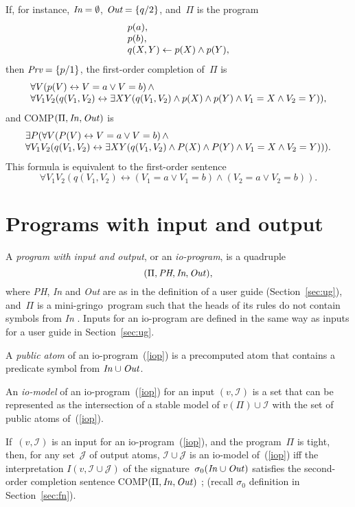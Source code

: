 \documentclass{tlp}
\def\ar{\leftarrow}
\def\lrar{\leftrightarrow}
\def\beq{\begin{equation}}
\def\eeq#1{\label{#1}\end{equation}}
\def\ba{\begin{array}}
\def\ea{\end{array}}
\def\gringo{{\sc gringo}}
\newcommand{\I}{\mathcal{I}}
\newcommand{\J}{\mathcal{J}}
\begin{document}
If, for instance, $\emph{In}=\emptyset$, $\emph{Out}=\{q/2\}$, and~$\Pi$
is the program
$$
\ba l
p(a),\\
p(b),\\
q(X,Y) \ar p(X) \land p(Y),
\ea$$
then $\emph{Prv}=\{p/1\}$,
the first-order completion of~$\Pi$ is
$$\ba l
\forall V(p(V) \lrar V=a \lor V=b)\,\land\\
\forall V_1V_2(q(V_1,V_2) \lrar \exists XY(q(V_1,V_2) \land p(X) \land p(Y)
\land V_1=X \land V_2=Y)),
\ea$$
and COMP$(\Pi,\emph{In\/},\emph{Out\/})$ is
$$
\ba l
\exists P(\forall V(P(V) \lrar V=a \lor V=b)\,\land\\
\forall V_1V_2(q(V_1,V_2) \lrar \exists XY(q(V_1,V_2) \land
P(X) \land P(Y) \land V_1=X \land V_2=Y))).
\ea
$$
This formula is equivalent to the first-order sentence
$$
\forall V_1V_2(q(V_1,V_2) \lrar (V_1=a \lor V_1=b)\land(V_2=a \lor V_2=b)).
$$

\section{Programs with input and output} \label{appc}

A \emph{program with input and output}, or an \emph{io-program},
is a quadruple
\beq
(\Pi,\emph{PH},\emph{In},\emph{Out\/}),
\eeq{iop}
where \emph{PH}, \emph{In} and \emph{Out} are as in the definition of
a user guide (Section~\ref{sec:ug}), and~$\Pi$ is a mini-\gringo\ program
such that the heads of its rules do not contain symbols from \emph{In}
\cite[Section~5.1]{fan20}.  Inputs for an io-program are defined in the same
way as inputs for a user guide in Section~\ref{sec:ug}.

A \emph{public atom} of an io-program~(\ref{iop}) is a precomputed atom
that contains a predicate symbol from $\emph{In\/}\cup\emph{Out\/}$.

An \emph{io-model} of an io-program~(\ref{iop}) for an input $(v,\I)$ is
a set that can be represented as the intersection of a stable model
of $v(\Pi)\cup\I$ with the set of public atoms of~(\ref{iop}).

If~$(v,\I)$ is an input for an io-program~(\ref{iop}), and the program~$\Pi$
is tight, then, for any set~$\J$ of output atoms, $\I\cup\J$ is an io-model
of~(\ref{iop}) iff the interpretation $I(v,\I\cup\J)$ of the
signature~$\sigma_0(\emph{In\/}\cup\emph{Out\/})$ satisfies the
second-order completion sentence COMP$(\Pi,\emph{In\/},\emph{Out\/})$
\cite[Theorem~2]{fan20}; (recall $\sigma_0$ definition in Section~\ref{sec:fn}).
\end{document}
